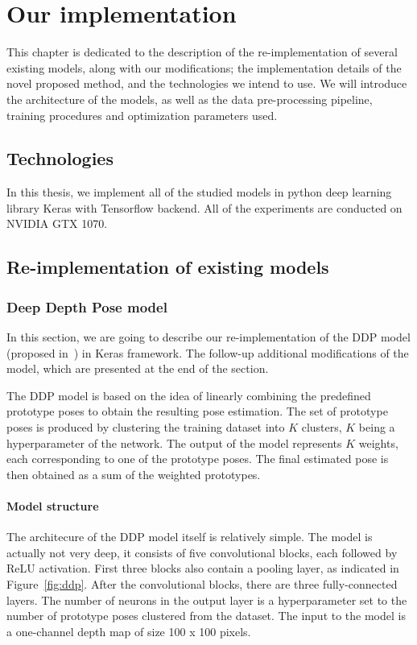 \chapter{Our implementation}\label{chap:implementation}
This chapter is dedicated to the description of the re-implementation of several existing models, along with our modifications; the implementation details of the novel proposed method, and the technologies we intend to use. We will introduce the architecture of the models, as well as the data pre-processing pipeline, training procedures and optimization parameters used.

\section{Technologies}
In this thesis, we implement all of the studied models in python deep learning library Keras with Tensorflow backend. All of the experiments are conducted on NVIDIA GTX 1070.

\section{Re-implementation of existing models}

\subsection{Deep Depth Pose model}
In this section, we are going to describe our re-implementation of the DDP model (proposed in~\cite{Marin18jvcir}) in Keras framework. The follow-up additional modifications of the model, which are presented at the end of the section.\par
\vspace{5mm}
\noindent
The DDP model is based on the idea of linearly combining the predefined prototype poses to obtain the resulting pose estimation. The set of prototype poses is produced by clustering the training dataset into $K$ clusters, $K$ being a hyperparameter of the network. The output of the model represents $K$ weights, each corresponding to one of the prototype poses. The final estimated pose is then obtained as a sum of the weighted prototypes.


\subsubsection{Model structure}

The architecure of the DDP model itself is relatively simple. The model is actually not very deep, it consists of five convolutional blocks, each followed by ReLU activation. First three blocks also contain a pooling layer, as indicated in Figure~\ref{fig:ddp}. After the convolutional blocks, there are three fully-connected layers. The number of neurons in the output layer is a hyperparameter set to the number of prototype poses clustered from the dataset. The input to the model is a one-channel depth map of size 100 x 100 pixels.\par

